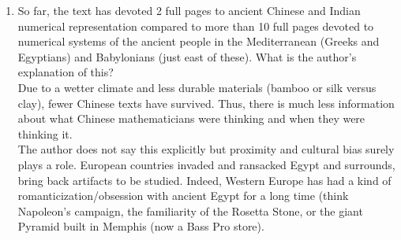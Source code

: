 \documentclass[12pt]{article}
\begin{document}
\begin{enumerate}
\item So far, the text has devoted 2 full pages to ancient Chinese and Indian numerical representation compared to more than 10 full pages devoted to numerical systems of the ancient people in the Mediterranean (Greeks and Egyptians) and Babylonians (just east of these). What is the author's explanation of this?\\

Due to a wetter climate and less durable materials (bamboo or silk versus clay), fewer Chinese texts have survived. Thus, there is much less information about what Chinese mathematicians were thinking and when they were thinking it. \\

The author does not say this explicitly but proximity and cultural bias surely plays a role. European countries invaded and ransacked Egypt and surrounds, bring back artifacts to be studied. Indeed, Western Europe has had a kind of romanticization/obsession with ancient Egypt for a long time (think Napoleon's campaign, the familiarity of the Rosetta Stone, or the giant Pyramid built in Memphis (now a Bass Pro store). 

\end{enumerate}
\end{document}
